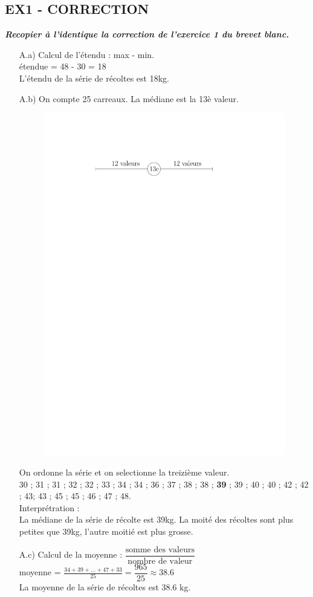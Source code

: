 \documentclass[11pt]{article}
\begin{document}
\begin{multicols}{2}

\subsection*{EX1 - CORRECTION}
\textit{\textbf{Recopier à l'identique la correction de l'exercice 1 du brevet blanc.}}

\begin{itemize}
	\item[A.a)] Calcul de l'étendu : max - min.\\
	étendue = 48 - 30 = 18\\
	L'étendu de la série de récoltes est 18kg.
	\item[A.b)] On compte 25 carreaux. La médiane est la 13è valeur. 
	\begin{figure}[H]
		\centering
		\includegraphics[width=0.6\linewidth]{3xx-dm/sources/dm1/ex1.pdf}
	\end{figure}
	On ordonne la série et on selectionne la treizième valeur.\\
	30 ; 31 ; 31 ; 32 ; 32 ; 33 ; 34 ; 34 ; 36 ; 37 ; 38 ; 38 ; \textbf{39} ; 39 ; 40 ; 40 ; 42 ; 42 ; 43; 43 ; 45 ; 45 ; 46 ; 47 ; 48.\\
	Interprétration :\\
	La médiane de la série de récolte est 39kg. La moité des récoltes sont plus petites que 39kg, l'autre moitié est plus grosse.
	\item[A.c)] Calcul de la moyenne : $\dfrac{\text{somme des valeurs}}{\text{nombre de valeur}}$\\
	moyenne = $\frac{34 + 39 + ... + 47 + 33}{25} = \dfrac{965}{25} \approx 38.6$\\
	La moyenne de la série de récoltes est 38.6 kg.


\end{itemize}
\end{multicols}
\end{document}
